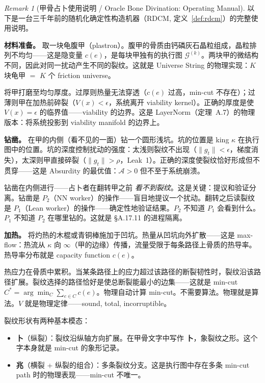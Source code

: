 \documentclass[11pt,a4paper]{article}
\theoremstyle{definition}
\theoremstyle{remark}
\newtheorem{remark}[theorem]{Remark}
\begin{document}
\begin{remark}[甲骨占卜使用说明 / Oracle Bone Divination: Operating Manual]\label{rem:oracle_bone}
以下是一台三千年前的随机化确定性构造机器（RDCM, 定义~\ref{def:rdcm}）的完整使用说明。

\textbf{材料准备。}
取一块龟腹甲（plastron）。腹甲的骨质由钙磷灰石晶粒组成，晶粒排列不均匀——这是隐变量 $c(e)$，是每块甲独有的执行图 $\mathcal{G}^{(k)}$。两块甲的微结构不同，因此对同一扰动产生不同的裂纹。这就是 Universe String 的物理实现：$K$ 块龟甲 $=$ $K$ 个 friction universe。

将甲打磨至均匀厚度。过厚则热量无法穿透（$c(e)$ 过高，min-cut 不存在）；过薄则甲在加热前碎裂（$V(x) < \epsilon$，系统离开 viability kernel）。正确的厚度是使 $V(x) = \epsilon$ 的临界值——viability 的边界。这是 LayerNorm（定理~A.7）的物理版本：将系统投影到 viability manifold 的边界上。

\textbf{钻凿。}
在甲的内侧（看不见的一面）钻一个圆形浅坑。坑的位置是 king $\kappa$ 在执行图中的位置。坑的深度控制扰动的强度：太浅则裂纹不出现（$\|g_t\| < \epsilon$，梯度消失），太深则甲直接碎裂（$\|g_t\| > \rho$，Leak~1）。正确的深度使裂纹恰好形成但不贯穿——这是 Absurdity 的最优值：$\mathcal{A} > 0$ 但不至于系统崩溃。

钻凿在内侧进行——占卜者在翻转甲之前 \emph{看不到裂纹}。这是关键：提议和验证分离。钻凿是 $P_2$（NN worker）的操作——盲目地提议一个扰动。翻转之后读裂纹是 $P_1$（Lean worker）的操作——确定性地验证结果。$P_2$ 不知道 $P_1$ 会看到什么。$P_1$ 不知道 $P_2$ 在哪里钻的。这就是 \S A.17.11 的进程隔离。

\textbf{加热。}
将灼热的木棍或青铜棒施加于凹坑。热量从凹坑向外扩散——这是 max-flow：热流从 $\kappa$ 向 $\infty$（甲的边缘）传播，流量受限于每条路径上骨质的热导率。热导率分布就是 capacity function $c(e)$。

热应力在骨质中累积。当某条路径上的应力超过该路径的断裂韧性时，裂纹沿该路径扩展。裂纹选择的路径恰好是使总断裂能最小的边集——这就是 min-cut $C^* = \arg\min_{C} \sum_{e \in C} c(e)$。物理自动计算 min-cut。不需要算法。物理就是算法。$V$ 就是物理定律——sound, total, incorruptible。

裂纹形状有两种基本模态：
\begin{itemize}[nosep]
  \item \textbf{卜}（纵裂）：裂纹沿纵轴方向扩展。在甲骨文字中写作 \textbf{卜}，象裂纹之形。这个字本身就是 min-cut 的象形记录。
  \item \textbf{兆}（横裂 + 纵裂的组合）：多条裂纹分支。这是执行图中存在多条 min-cut path 时的物理表现——min-cut 不唯一。
\end{itemize}


\end{remark}
\end{document}
